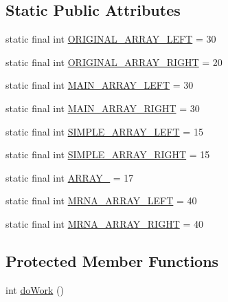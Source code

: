 \subsection*{Static Public Attributes}
\begin{DoxyCompactItemize}
\item 
static final int \hyperlink{classbroad_1_1pda_1_1seq_1_1rap_1_1_count_probes_a349812a752067daa0055ebd890cee0cd}{O\+R\+I\+G\+I\+N\+A\+L\+\_\+\+A\+R\+R\+A\+Y\+\_\+\+L\+E\+F\+T} = 30
\item 
static final int \hyperlink{classbroad_1_1pda_1_1seq_1_1rap_1_1_count_probes_acb272d34066aa6aee47b02242d0167b1}{O\+R\+I\+G\+I\+N\+A\+L\+\_\+\+A\+R\+R\+A\+Y\+\_\+\+R\+I\+G\+H\+T} = 20
\item 
static final int \hyperlink{classbroad_1_1pda_1_1seq_1_1rap_1_1_count_probes_a109ecc82e1ea53d30307ba78b55c7913}{M\+A\+I\+N\+\_\+\+A\+R\+R\+A\+Y\+\_\+\+L\+E\+F\+T} = 30
\item 
static final int \hyperlink{classbroad_1_1pda_1_1seq_1_1rap_1_1_count_probes_a78a3871ea075fd750dbc7ec0fca299ad}{M\+A\+I\+N\+\_\+\+A\+R\+R\+A\+Y\+\_\+\+R\+I\+G\+H\+T} = 30
\item 
static final int \hyperlink{classbroad_1_1pda_1_1seq_1_1rap_1_1_count_probes_a7ae07f296cfce6d2d8c64f63087a0f1b}{S\+I\+M\+P\+L\+E\+\_\+\+A\+R\+R\+A\+Y\+\_\+\+L\+E\+F\+T} = 15
\item 
static final int \hyperlink{classbroad_1_1pda_1_1seq_1_1rap_1_1_count_probes_aef46c558c764f0fe20658d39aa46b7fb}{S\+I\+M\+P\+L\+E\+\_\+\+A\+R\+R\+A\+Y\+\_\+\+R\+I\+G\+H\+T} = 15
\item 
static final int \hyperlink{classbroad_1_1pda_1_1seq_1_1rap_1_1_count_probes_a4b12fec1c874ed8cb8dca8df4eaf293a}{A\+R\+R\+A\+Y\+\_} = 17
\item 
static final int \hyperlink{classbroad_1_1pda_1_1seq_1_1rap_1_1_count_probes_a6c60be1a6f1cde0d5f6a4d9defa20cd2}{M\+R\+N\+A\+\_\+\+A\+R\+R\+A\+Y\+\_\+\+L\+E\+F\+T} = 40
\item 
static final int \hyperlink{classbroad_1_1pda_1_1seq_1_1rap_1_1_count_probes_a5c1733de80850f1e45df3b631431ecfe}{M\+R\+N\+A\+\_\+\+A\+R\+R\+A\+Y\+\_\+\+R\+I\+G\+H\+T} = 40
\end{DoxyCompactItemize}
\subsection*{Protected Member Functions}
\begin{DoxyCompactItemize}
\item 
int \hyperlink{classbroad_1_1pda_1_1seq_1_1rap_1_1_count_probes_a8c1d69515e3ae503f4d20c5382f0c462}{do\+Work} ()
\end{DoxyCompactItemize}


